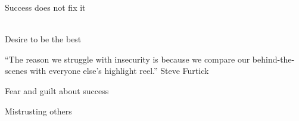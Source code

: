 \documentclass[aspectratio=169]{beamer}
\begin{document}
\begin{frame}
  \begin{center}
    \Huge Success does not fix it
    \\ \small \cite{clanceimes78}
    \\ \small \cite{sakulku11}
  \end{center}
\end{frame}

\begin{frame}
  \begin{center}
    \Huge Desire to be the best
    \small
    \\ \small \cite{sakulku11}
  \end{center}
\end{frame}

\begin{frame}
  \begin{center}
    \Huge ``The reason we struggle with insecurity is because we compare our behind-the-scenes with everyone else’s highlight reel.'' Steve Furtick
  \end{center}
\end{frame}

\begin{frame}
  \begin{center}
    \Huge Fear and guilt about success
    \\ \small \cite{sakulku11}
  \end{center}
\end{frame}

\begin{frame}
  \begin{center}
    \Huge Mistrusting others
    \\ \small \cite{langford93}
  \end{center}
\end{frame}
\end{document}
